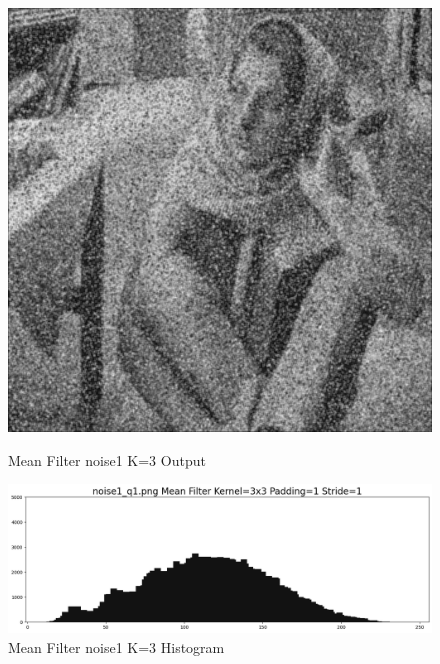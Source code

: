 \documentclass[12pt,a4paper]{report}
\begin{document}
\begin{figure}[!htb]
  \includegraphics[width=1\linewidth]{output/noise1_q1_K3P1.png}
  \caption{Mean Filter noise1 K=3 Output}
  \includegraphics[width=1\linewidth]{output/noise1_q1_K3P1_his.png}
  \caption{Mean Filter noise1 K=3 Histogram}
\end{figure}
\end{document}
